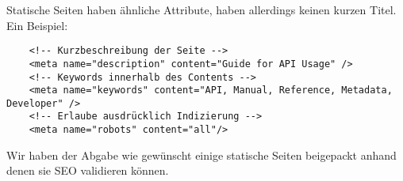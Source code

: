 Statische Seiten haben ähnliche Attribute, haben allerdings keinen kurzen Titel.
Ein Beispiel:

\begin{verbatim}
    <!-- Kurzbeschreibung der Seite -->
    <meta name="description" content="Guide for API Usage" />
    <!-- Keywords innerhalb des Contents -->
    <meta name="keywords" content="API, Manual, Reference, Metadata, Developer" />
    <!-- Erlaube ausdrücklich Indizierung -->
    <meta name="robots" content="all"/>
\end{verbatim}




Wir haben der Abgabe wie gewünscht einige statische Seiten beigepackt anhand denen sie SEO
validieren können.

